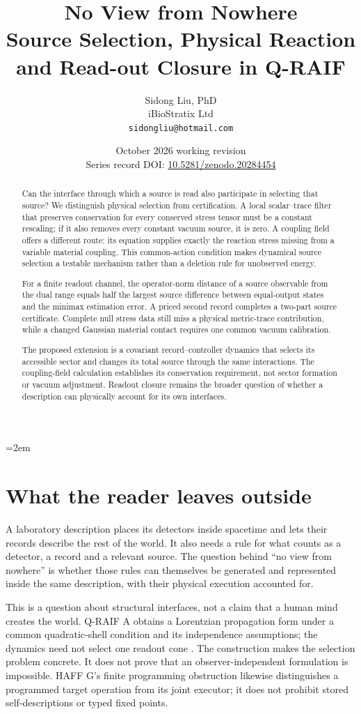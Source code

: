 \documentclass[12pt,a4paper]{article}
\title{\textbf{No View from Nowhere}\\\large Source Selection, Physical Reaction and Read-out Closure in Q-RAIF}
\author{Sidong Liu, PhD\\\small iBioStratix Ltd\\\small\texttt{sidongliu@hotmail.com}}
\date{October 2026 working revision\\\small Series record DOI:
\href{https://doi.org/10.5281/zenodo.20284454}{10.5281/zenodo.20284454}}
\theoremstyle{definition}
\begin{document}
\emergencystretch=2em
\raggedbottom
\maketitle

\begin{abstract}
Can the interface through which a source is read also participate in selecting that source?
We distinguish physical selection from certification. A local scalar--trace filter that preserves conservation for every conserved stress tensor must be a constant rescaling; if it also removes every constant vacuum source, it is zero.
A coupling field offers a different route: its equation supplies exactly the reaction stress missing from a variable material coupling.
This common-action condition makes dynamical source selection a testable mechanism rather than a deletion rule for unobserved energy.

For a finite readout channel, the operator-norm distance of a source observable from the dual range equals half the largest source difference between equal-output states and the minimax estimation error.
A priced second record completes a two-part source certificate.
Complete null stress data still miss a physical metric-trace contribution, while a changed Gaussian material contact requires one common vacuum calibration.

The proposed extension is a covariant record--controller dynamics that selects its accessible sector and changes its total source through the same interactions.
The coupling-field calculation establishes its conservation requirement, not sector formation or vacuum adjustment.
Readout closure remains the broader question of whether a description can physically account for its own interfaces.
\end{abstract}

\section{What the reader leaves outside}
\label{sec:blade}

A laboratory description places its detectors inside spacetime and lets
their records describe the rest of the world. It also needs a rule for
what counts as a detector, a record and a relevant source. The question
behind ``no view from nowhere'' is whether those rules can themselves be
generated and represented inside the same description, with their physical
execution accounted for.

This is a question about structural interfaces, not a claim that a human
mind creates the world. Q-RAIF A obtains a Lorentzian propagation form
under a common quadratic-shell condition and its independence assumptions;
the dynamics need not select one readout cone \cite{Liu2026QRAIFA}. The
construction makes the selection problem concrete. It does not prove
that an observer-independent formulation is impossible. HAFF G's finite
programming obstruction likewise distinguishes a programmed target
operation from its joint executor; it does not prohibit stored
self-descriptions or typed fixed points.
\end{document}
